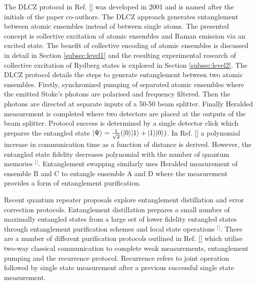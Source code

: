 The DLCZ protocol in Ref. [] was developed in 2001 and is named after the initials of the paper co-authors. The DLCZ approach generates entanglement between atomic ensembles instead of between single atoms. The presented concept is collective excitation of atomic ensembles and Raman emission via an excited state. The benefit of collective encoding of atomic ensembles is discussed in detail in Section \ref{subsec:level1} and the resulting experimental research of collective excitation of Rydberg states is explored in Section \ref{subsec:level2}. The DLCZ protocol details the steps to generate entanglement between two atomic ensembles. Firstly, synchronized pumping of separated atomic ensembles where the emitted Stoke's photons are polarised and frequency filtered. Then the photons are directed at separate inputs of a 50-50 beam splitter. Finally Heralded measurement is completed where two detectors are placed at the outputs of the beam splitter. Protocol success is determined by a single detector click which prepares the entangled state $\lvert\Psi\rangle=\frac{1}{\sqrt{2}}(\lvert0\rangle\lvert1\rangle+\lvert1\rangle\lvert0\rangle)$. In Ref. [] a polynomial increase in communication time as a function of distance is derived. However, the entangled state fidelity decreases polynomial with the number of quantum memories $^{[}$\citep{Sangouard2011QuantumOptics}$^{]}$. Entanglement swapping similarly uses Heralded measurement of ensemble B and C to entangle ensemble A and D where the measurement provides a form of entanglement purification. 

Recent quantum repeater proposals explore entanglement distillation and error correction protocols. Entanglement distillation prepares a small number of maximally entangled states from a large set of lower fidelity entangled states through entanglement purification schemes and local state operations $^{[}$\citep{Dur2007EntanglementCorrection,Muralidharan2016OptimalCommunication}$^{]}$. There are a number of different purification protocols outlined in Ref. [] which utilise two-way classical communication to complete weak measurements, entanglement pumping and the recurrence protocol. Recurrence refers to joint operation followed by single state measurement after a previous successful single state measurement. 

